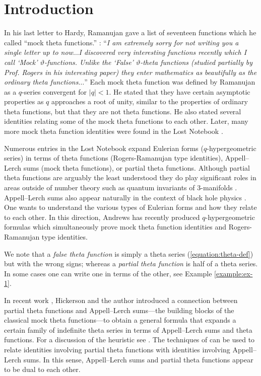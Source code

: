 \documentclass[12pt,reqno]{amsart}
\theoremstyle{remark}
\theoremstyle{definition}
\numberwithin{theorem}{section} \numberwithin{equation}{section}
\numberwithin{example}{section}
\begin{document}
\section{Introduction}

In his last letter to Hardy, Ramanujan gave a list of seventeen functions which he called ``mock theta functions.''   \cite[p. xxxi]{R1}: ``{\em I am extremely sorry for not writing you a single letter up to now$\dots$I discovered very interesting functions recently which I call `Mock' $\vartheta$-functions.  Unlike the `False' $\vartheta$-theta functions (studied partially by Prof. Rogers in his interesting paper) they enter mathematics as beautifully as the ordinary theta functions$\dots$}''  Each mock theta function was defined by Ramanujan as a $q$-series convergent for $|q|<1$.  He stated that they have certain asymptotic properties as $q$ approaches a root of unity, similar to the properties of ordinary theta functions, but that they are not theta functions.  He also stated several identities relating some of the mock theta functions to each other.  Later, many more mock theta function identities were found in the Lost Notebook \cite{RLN}.

Numerous entries in the Lost Notebook expand Eulerian forms ($q$-hypergeometric series) in terms of theta functions (Rogers-Ramanujan type identities), Appell--Lerch sums (mock theta functions), or partial theta functions.   Although partial theta functions are arguably the least understood they do play significant roles in areas outside of number theory such as quantum invariants of $3$-manifolds \cite{LZ}.  Appell--Lerch sums also appear naturally in the context of black hole physics \cite{DMZ}.  One wants to understand the various types of Eulerian forms and how they relate to each other.  In this direction, Andrews \cite{A2} has recently produced $q$-hypergeometric formulas which simultaneously prove mock theta function identities and Rogers-Ramanujan type identities. 

 We note that a {\em false theta function} is simply a theta series (\ref{equation:theta-def}) but with the wrong signs; whereas a {\em partial theta function} is half of a theta series.  In some cases one can write one in terms of the other, see Example \ref{example:ex-1}.

In recent work \cite{HM}, Hickerson and the author introduced a connection between partial theta functions and Appell--Lerch sums---the building blocks of the classical mock theta functions---to obtain a general formula that expands a certain family of indefinite theta series in terms of Appell--Lerch sums and theta functions.  For a discussion of the heuristic see \cite[Section $2$]{HM}.
The techniques of \cite{HM} can be used to relate identities involving partial theta functions with identities involving Appell--Lerch sums.  In this sense, Appell--Lerch sums and partial theta functions appear to be dual to each other. 
\end{document}
